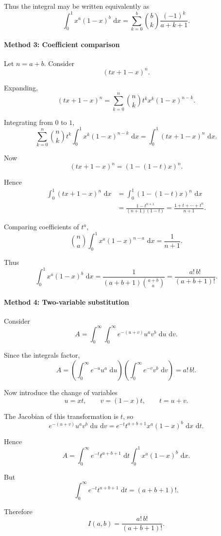 \documentclass[12pt]{article}
\newcommand{\dd}{\,\mathrm{d}}
\begin{document}
Thus the integral may be written equivalently as
\[
\boxed{
\int_0^1 x^a(1-x)^b\,\dd x
=\sum_{k=0}^{b}\binom{b}{k}\frac{(-1)^k}{a+k+1}.
}
\]


\paragraph{Method 3: Coefficient comparison}

Let \(n=a+b\). Consider
\[
(tx+1-x)^n.
\]

Expanding,
\[
(tx+1-x)^n
=\sum_{k=0}^{n}\binom{n}{k}t^k x^k(1-x)^{n-k}.
\]

Integrating from \(0\) to \(1\),
\[
\sum_{k=0}^{n}\binom{n}{k}t^k
\int_0^1 x^k(1-x)^{n-k}\,\dd x
=\int_0^1 (tx+1-x)^n\,\dd x.
\]

Now
\[
(tx+1-x)^n=(1-(1-t)x)^n.
\]

Hence
\begin{align*}
\int_0^1 (tx+1-x)^n\,\dd x
&=\int_0^1 (1-(1-t)x)^n\,\dd x \\
&=\frac{1-t^{n+1}}{(n+1)(1-t)}
=\frac{1+t+\cdots+t^n}{n+1}.
\end{align*}

Comparing coefficients of \(t^a\),
\[
\binom{n}{a}\int_0^1 x^a(1-x)^{n-a}\,\dd x
=\frac{1}{n+1}.
\]

Thus
\[
\int_0^1 x^a(1-x)^b\,\dd x
=\frac{1}{(a+b+1)\binom{a+b}{a}}
=\frac{a!\,b!}{(a+b+1)!}.
\]

\paragraph{Method 4: Two-variable substitution}

Consider
\[
A=\int_0^\infty\int_0^\infty e^{-(u+v)}u^a v^b\,\dd u\,\dd v.
\]

Since the integrals factor,
\[
A=\left(\int_0^\infty e^{-u}u^a\,\dd u\right)
\left(\int_0^\infty e^{-v}v^b\,\dd v\right)
=a!\,b!.
\]

Now introduce the change of variables
\[
u=xt,\qquad v=(1-x)t,
\qquad t=u+v.
\]

The Jacobian of this transformation is \(t\), so
\[
e^{-(u+v)}u^a v^b\,\dd u\,\dd v
=e^{-t}t^{a+b+1}x^a(1-x)^b\,\dd x\,\dd t.
\]

Hence
\[
A=\int_0^\infty e^{-t}t^{a+b+1}\,\dd t
\int_0^1 x^a(1-x)^b\,\dd x.
\]

But
\[
\int_0^\infty e^{-t}t^{a+b+1}\,\dd t=(a+b+1)!.
\]

Therefore
\[
I(a,b)=\frac{a!\,b!}{(a+b+1)!}.
\]
\end{document}
